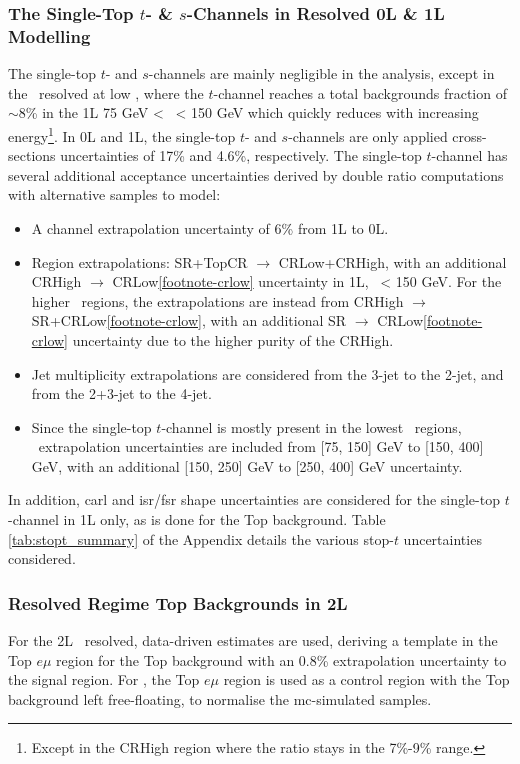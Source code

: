 \subsubsection{The Single-Top $t$- \& $s$-Channels in Resolved 0L \& 1L Modelling}
The single-top $t$- and $s$-channels are mainly negligible in the analysis, except in the \vhb\ resolved at low \ptv, where the $t$-channel reaches a total backgrounds fraction of $\sim$8\% in the 1L 75 GeV < \ptv\ < 150 GeV which quickly reduces with increasing energy\footnote{Except in the CRHigh region where the ratio stays in the 7\%-9\% range.}. In 0L and 1L, the single-top $t$- and $s$-channels are only applied cross-sections uncertainties of 17\% and 4.6\%, respectively. The single-top $t$-channel has several additional acceptance uncertainties derived by double ratio computations with alternative samples to model: %
\begin{itemize}
    \item A channel extrapolation uncertainty of 6\% from 1L to 0L.
    \item Region extrapolations: SR+TopCR $\rightarrow$ CRLow+CRHigh, with an additional CRHigh $\rightarrow$ CRLow\cref{footnote-crlow} uncertainty in 1L, \ptv\ < 150 GeV. For the higher \ptv\ regions, the extrapolations are instead from CRHigh $\rightarrow$ SR+CRLow\cref{footnote-crlow}, with an additional SR $\rightarrow$ CRLow\cref{footnote-crlow} uncertainty due to the higher purity of the CRHigh.
    \item Jet multiplicity extrapolations are considered from the 3-jet to the 2-jet, and from the 2+3-jet to the 4-jet.
    \item Since the single-top $t$-channel is mostly present in the lowest \ptv\ regions, \ptv\ extrapolation uncertainties are included from [75, 150] GeV to [150, 400] GeV, with an additional [150, 250] GeV to [250, 400] GeV uncertainty.
\end{itemize}
In addition, \gls{carl} and \gls{isr}/\gls{fsr} shape uncertainties are considered for the single-top $t$-channel in 1L only, as is done for the Top background. Table \ref{tab:stopt_summary} of the Appendix details the various stop-$t$ uncertainties considered.

\subsubsection{Resolved Regime Top Backgrounds in 2L} 
For the 2L \vhb\ resolved, data-driven estimates are used, deriving a template in the Top $e\mu$ region for the Top background with an 0.8\% extrapolation uncertainty to the signal region. For \vhc, the Top $e\mu$ region is used as a control region with the Top background left free-floating, to normalise the \gls{mc}-simulated samples.

